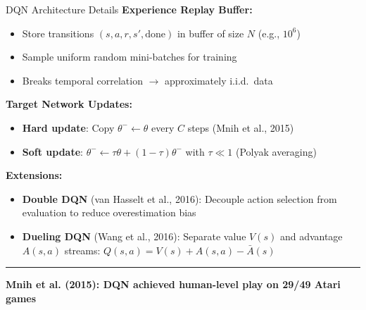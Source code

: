 \documentclass[8pt,aspectratio=169]{beamer}
\newcommand{\bottomnote}[1]{%
\vfill
\vspace{-2mm}
\textcolor{mllavender2}{\rule{\textwidth}{0.4pt}}
\vspace{1mm}
\footnotesize
\textbf{#1}
}
\begin{document}
\begin{frame}[t]{DQN Architecture Details}
\textbf{Experience Replay Buffer:}
\begin{itemize}
\item Store transitions $(s, a, r, s', \text{done})$ in buffer of size $N$ (e.g., $10^6$)
\item Sample uniform random mini-batches for training
\item Breaks temporal correlation $\rightarrow$ approximately i.i.d.\ data
\end{itemize}
\vspace{0.3em}
\textbf{Target Network Updates:}
\begin{itemize}
\item \textbf{Hard update}: Copy $\theta^- \leftarrow \theta$ every $C$ steps (Mnih et al., 2015)
\item \textbf{Soft update}: $\theta^- \leftarrow \tau\theta + (1-\tau)\theta^-$ with $\tau \ll 1$ (Polyak averaging)
\end{itemize}
\vspace{0.3em}
\textbf{Extensions:}
\begin{itemize}
\item \textbf{Double DQN} (van Hasselt et al., 2016): Decouple action selection from evaluation to reduce overestimation bias
\item \textbf{Dueling DQN} (Wang et al., 2016): Separate value $V(s)$ and advantage $A(s,a)$ streams: $Q(s,a) = V(s) + A(s,a) - \bar{A}(s)$
\end{itemize}
\bottomnote{Mnih et al. (2015): DQN achieved human-level play on 29/49 Atari games}
\end{frame}
\end{document}
